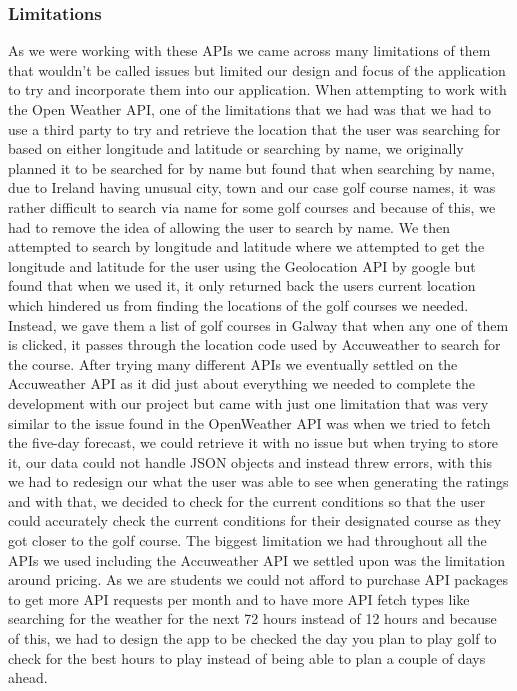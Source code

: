 \subsubsection{Limitations}
As we were working with these APIs we came across many limitations of them that wouldn't be called issues but limited our design and focus of the application to try and incorporate them into our application.
\newline
\newline
When attempting to work with the Open Weather API, one of the limitations that we had was that we had to use a third party to try and retrieve the location that the user was searching for based on either longitude and latitude or searching by name, we originally planned it to be searched for by name but found that when searching by name, due to Ireland having unusual city, town and our case golf course names, it was rather difficult to search via name for some golf courses and because of this, we had to remove the idea of allowing the user to search by name.
\newline
\newline
We then attempted to search by longitude and latitude where we attempted to get the longitude and latitude for the user using the Geolocation API by google but found that when we used it, it only returned back the users current location which hindered us from finding the locations of the golf courses we needed. Instead, we gave them a list of golf courses in Galway that when any one of them is clicked, it passes through the location code used by Accuweather to search for the course.
\newline
\newline
After trying many different APIs we eventually settled on the Accuweather API as it did just about everything we needed to complete the development with our project but came with just one limitation that was very similar to the issue found in the OpenWeather API was when we tried to fetch the five-day forecast, we could retrieve it with no issue but when trying to store it, our data could not handle JSON objects and instead threw errors, with this we had to redesign our what the user was able to see when generating the ratings and with that, we decided to check for the current conditions so that the user could accurately check the current conditions for their designated course as they got closer to the golf course.
\newline
\newline
The biggest limitation we had throughout all the APIs we used including the Accuweather API we settled upon was the limitation around pricing. As we are students we could not afford to purchase API packages to get more API requests per month and to have more API fetch types like searching for the weather for the next 72 hours instead of 12 hours and because of this, we had to design the app to be checked the day you plan to play golf to check for the best hours to play instead of being able to plan a couple of days ahead.
